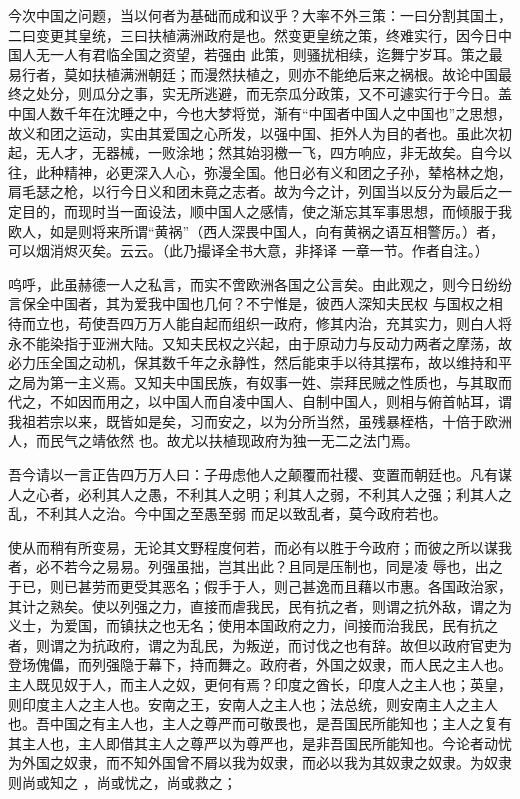 \documentclass{article}
\begin{document}
今次中国之问题，当以何者为基础而成和议乎？大率不外三策：一曰分割其国土，二曰变更其皇统，三曰扶植满洲政府是也。然变更皇统之策，终难实行，因今日中国人无一人有君临全国之资望，若强由
\newpage
此策，则骚扰相续，迄舞宁岁耳。策之最易行者，莫如扶植满洲朝廷；而漫然扶植之，则亦不能绝后来之祸根。故论中国最终之处分，则瓜分之事，实无所逃避，而无奈瓜分政策，又不可遽实行于今日。盖中国人数千年在沈睡之中，今也大梦将觉，渐有“中国者中国人之中国也”之思想，故义和团之运动，实由其爱国之心所发，以强中国、拒外人为目的者也。虽此次初起，无人才，无器械，一败涂地；然其始羽檄一飞，四方响应，非无故矣。自今以往，此种精神，必更深入人心，弥漫全国。他日必有义和团之子孙，辇格林之炮，肩毛瑟之枪，以行今日义和团未竟之志者。故为今之计，列国当以反分为最后之一定目的，而现时当一面设法，顺中国人之感情，使之渐忘其军事思想，而倾服于我欧人，如是则将来所谓“黄祸”（西人深畏中国人，向有黄祸之语互相警厉。）者，可以烟消烬灭矣。云云。（此乃撮译全书大意，非择译
一章一节。作者自注。） 

呜呼，此虽赫德一人之私言，而实不啻欧洲各国之公言矣。由此观之，则今日纷纷言保全中国者，其为爱我中国也几何？不宁惟是，彼西人深知夫民权
\newpage
与国权之相待而立也，苟使吾四万万人能自起而组织一政府，修其内治，充其实力，则白人将永不能染指于亚洲大陆。又知夫民权之兴起，由于原动力与反动力两者之摩荡，故必力压全国之动机，保其数千年之永静性，然后能束手以待其摆布，故以维持和平之局为第一主义焉。又知夫中国民族，有奴事一姓、崇拜民贼之性质也，与其取而代之，不如因而用之，以中国人而自凌中国人、自制中国人，则相与俯首帖耳，谓我祖若宗以来，既皆如是矣，习而安之，以为分所当然，虽残暴桎梏，十倍于欧洲人，而民气之靖依然
也。故尤以扶植现政府为独一无二之法门焉。 

吾今请以一言正告四万万人曰：子毋虑他人之颠覆而社稷、变置而朝廷也。凡有谋人之心者，必利其人之愚，不利其人之明；利其人之弱，不利其人之强；利其人之乱，不利其人之治。今中国之至愚至弱
而足以致乱者，莫今政府若也。 

使从而稍有所变易，无论其文野程度何若，而必有以胜于今政府；而彼之所以谋我者，必不若今之易易。列强虽拙，岂其出此？且同是压制也，同是凌
\newpage
辱也，出之于已，则已甚劳而更受其恶名；假手于人，则己甚逸而且藉以市惠。各国政治家，其计之熟矣。使以列强之力，直接而虐我民，民有抗之者，则谓之抗外敌，谓之为义士，为爱国，而镇扶之也无名；使用本国政府之力，间接而治我民，民有抗之者，则谓之为抗政府，谓之为乱民，为叛逆，而讨伐之也有辞。故但以政府官吏为登场傀儡，而列强隐于幕下，持而舞之。政府者，外国之奴隶，而人民之主人也。主人既见奴于人，而主人之奴，更何有焉？印度之酋长，印度人之主人也；英皇，则印度主人之主人也。安南之王，安南人之主人也；法总统，则安南主人之主人也。吾中国之有主人也，主人之尊严而可敬畏也，是吾国民所能知也；主人之复有其主人也，主人即借其主人之尊严以为尊严也，是非吾国民所能知也。今论者动忧为外国之奴隶，而不知外国曾不屑以我为奴隶，而必以我为其奴隶之奴隶。为奴隶则尚或知之
，尚或忧之，尚或救之； 
\end{document}
